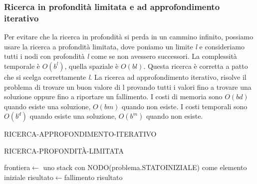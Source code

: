 \documentclass{article}
\begin{document}
\subsubsection{Ricerca in profondità limitata e ad approfondimento iterativo}
Per evitare che la ricerca in profondità si perda in un cammino infinito, possiamo usare la ricerca a profondità limitata, dove poniamo un limite \textit{l} e consideriamo tutti i nodi con profondità \textit{l} come se non avessero successori.
La complessità temporale è $O(b^l)$, quella spaziale è $O(bl)$. Questa ricerca è corretta a patto che si scelga correttamente \textit{l}.
La ricerca ad approfondimento iterativo, risolve il problema di trovare un buon valore di l\textit{} provando tutti i valori fino a trovare una soluzione oppure fino a riportare un fallimento. I costi di memoria sono $O(bd)$ quando esiste una soluzione, $O(bm)$ quando non esiste. I costi temporali sono $O(b^d)$ quando esiste una soluzione, $O(b^m)$ quando non esiste.
\begin{center}
\begin{algorithm}
\caption{RICERCA-APPROFONDIMENTO-ITERATIVO}
\end{algorithm}
\end{center}
\begin{center}
\begin{algorithm}
\caption{RICERCA-PROFONDITÀ-LIMITATA}
frontiera$\leftarrow$ uno stack con NODO(problema.STATOINIZIALE) come elemento iniziale\;
risultato$\leftarrow$fallimento\;
\Return risultato\;
\end{algorithm}
\end{center}
\newpage
\end{document}
